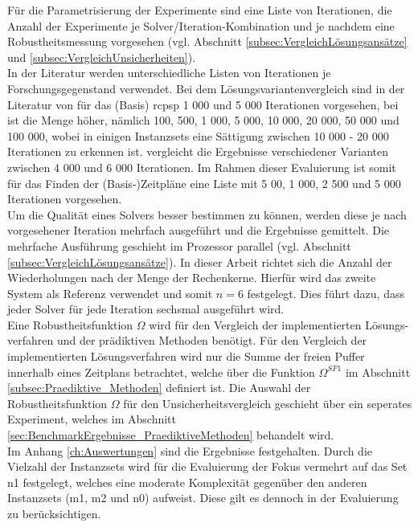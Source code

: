 Für die Parametrisierung der Experimente sind eine Liste von Iterationen, die Anzahl der Experimente je Solver/Iteration-Kombination und je nachdem eine Robustheitsmessung vorgesehen (vgl. Abschnitt \ref{subsec:VergleichLösungsansätze} und \ref{subsec:VergleichUnsicherheiten}).  \\

In der Literatur werden unterschiedliche Listen von Iterationen je Forschungsgegenstand verwendet. Bei dem Lösungsvariantenvergleich sind in der Literatur von \cite[S. 16]{kolisch_psplib_1997} für das (Basis) \ac{rcpsp} 1 000 und 5 000 Iterationen vorgesehen, bei \cite[S. 148]{jozefowska_simulated_2001} ist die Menge höher, nämlich 100, 500, 1 000, 5 000, 10 000, 20 000, 50 000 und 100 000, wobei in einigen Instanzsets eine Sättigung zwischen 10 000 - 20 000 Iterationen zu erkennen ist. \cite[S. 612]{wuliang_improved_2014} vergleicht die Ergebnisse verschiedener Varianten zwischen 4 000 und 6 000 Iterationen. Im Rahmen dieser Evaluierung ist somit für das Finden der (Basis-)Zeitpläne eine Liste mit 5 00, 1 000, 2 500 und 5 000 Iterationen vorgesehen. \\

Um die Qualität eines Solvers besser bestimmen zu können, werden diese je nach vorgesehener Iteration mehrfach ausgeführt und die Ergebnisse gemittelt. Die mehrfache Ausführung geschieht im Prozessor parallel (vgl. Abschnitt \ref{subsec:VergleichLösungsansätze}). In dieser Arbeit richtet sich die Anzahl der Wiederholungen nach der Menge der Rechenkerne. Hierfür wird das zweite System als Referenz verwendet und somit $n = 6$ festgelegt. Dies führt dazu, dass jeder Solver für jede Iteration sechsmal ausgeführt wird. \\

Eine Robustheitsfunktion $\Omega$ wird für den Vergleich der implementierten Lösungs-verfahren und der prädiktiven Methoden benötigt. Für den Vergleich der implementierten Lösungsverfahren wird nur die Summe der freien Puffer innerhalb eines Zeitplans betrachtet, welche über die Funktion $\Omega^{SF1}$ im Abschnitt \ref{subsec:Praediktive_Methoden} definiert ist. Die Auswahl der Robustheitsfunktion $\Omega$ für den Unsicherheitsvergleich geschieht über ein seperates Experiment, welches im Abschnitt \ref{sec:BenchmarkErgebnisse_PraediktiveMethoden} behandelt wird. \\

Im Anhang \ref{ch:Auswertungen} sind die Ergebnisse festgehalten. Durch die Vielzahl der Instanzsets wird für die Evaluierung der Fokus vermehrt auf das Set n1 festgelegt, welches eine moderate Komplexität gegenüber den anderen Instanzsets (m1, m2 und n0) aufweist. Diese gilt es dennoch in der Evaluierung zu berücksichtigen. 
